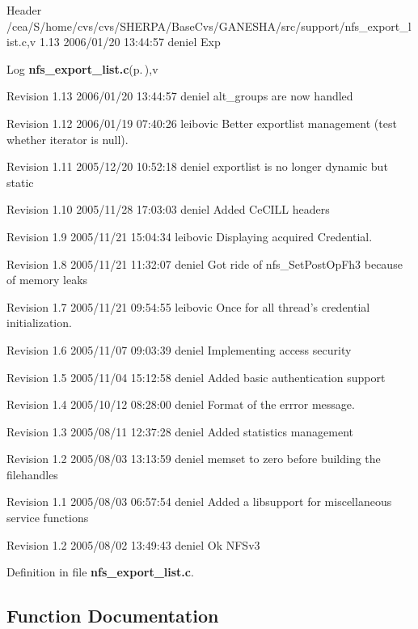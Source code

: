 \begin{Desc}
\item[Header]/cea/S/home/cvs/cvs/SHERPA/Base\-Cvs/GANESHA/src/support/nfs\_\-export\_\-list.c,v 1.13 2006/01/20 13:44:57 deniel Exp \end{Desc}


\begin{Desc}
\item[Log]{\bf nfs\_\-export\_\-list.c}{\rm (p.\,\pageref{nfs__export__list_8c})},v \end{Desc}
Revision 1.13 2006/01/20 13:44:57 deniel alt\_\-groups are now handled

Revision 1.12 2006/01/19 07:40:26 leibovic Better exportlist management (test whether iterator is null).

Revision 1.11 2005/12/20 10:52:18 deniel exportlist is no longer dynamic but static

Revision 1.10 2005/11/28 17:03:03 deniel Added Ce\-CILL headers

Revision 1.9 2005/11/21 15:04:34 leibovic Displaying acquired Credential.

Revision 1.8 2005/11/21 11:32:07 deniel Got ride of nfs\_\-Set\-Post\-Op\-Fh3 because of memory leaks

Revision 1.7 2005/11/21 09:54:55 leibovic Once for all thread's credential initialization.

Revision 1.6 2005/11/07 09:03:39 deniel Implementing access security

Revision 1.5 2005/11/04 15:12:58 deniel Added basic authentication support

Revision 1.4 2005/10/12 08:28:00 deniel Format of the errror message.

Revision 1.3 2005/08/11 12:37:28 deniel Added statistics management

Revision 1.2 2005/08/03 13:13:59 deniel memset to zero before building the filehandles

Revision 1.1 2005/08/03 06:57:54 deniel Added a libsupport for miscellaneous service functions

Revision 1.2 2005/08/02 13:49:43 deniel Ok NFSv3

Definition in file {\bf nfs\_\-export\_\-list.c}.

\subsection{Function Documentation}
